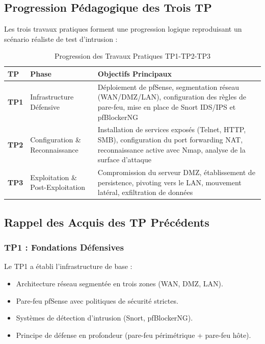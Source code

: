 \documentclass[12pt,a4paper,openany]{report}
\newcommand{\tableheadcolor}{\rowcolor{tableheadbg}}
\begin{document}
	\subsection{Progression Pédagogique des Trois TP}
	
	Les trois travaux pratiques forment une progression logique reproduisant un scénario réaliste de test d'intrusion :
	
	\begin{table}[H]
		\centering
		\renewcommand{\arraystretch}{1.5}
		\setlength{\arrayrulewidth}{0.5pt}
		\begin{tabular}{>{\centering\arraybackslash}p{1.5cm} p{4cm} p{7cm}}
			\arrayrulecolor{tableborder}
			\hline
			\tableheadcolor
			\textcolor{tableheadfg}{\textbf{TP}} &
			\textcolor{tableheadfg}{\textbf{Phase}} &
			\textcolor{tableheadfg}{\textbf{Objectifs Principaux}} \\
			\hline
			\rowcolor{tablerowalt}
			\textbf{TP1} & Infrastructure Défensive & Déploiement de pfSense, segmentation réseau (WAN/DMZ/LAN), configuration des règles de pare-feu, mise en place de Snort IDS/IPS et pfBlockerNG \\
			
			\textbf{TP2} & Configuration \& Reconnaissance & Installation de services exposés (Telnet, HTTP, SMB), configuration du port forwarding NAT, reconnaissance active avec Nmap, analyse de la surface d'attaque \\
			
			\rowcolor{tablerowalt}
			\textbf{TP3} & Exploitation \& Post-Exploitation & Compromission du serveur DMZ, établissement de persistence, pivoting vers le LAN, mouvement latéral, exfiltration de données \\
			\hline
		\end{tabular}
		\caption{Progression des Travaux Pratiques TP1-TP2-TP3}
		\label{tab:tp-progression}
	\end{table}
	
	\subsection{Rappel des Acquis des TP Précédents}
	
	\subsubsection{TP1 : Fondations Défensives}
	Le TP1 a établi l'infrastructure de base :
	\begin{itemize}
		\item Architecture réseau segmentée en trois zones (WAN, DMZ, LAN).
		\item Pare-feu pfSense avec politiques de sécurité strictes.
		\item Systèmes de détection d'intrusion (Snort, pfBlockerNG).
		\item Principe de défense en profondeur (pare-feu périmétrique + pare-feu hôte).
	\end{itemize}
	
\end{document}
